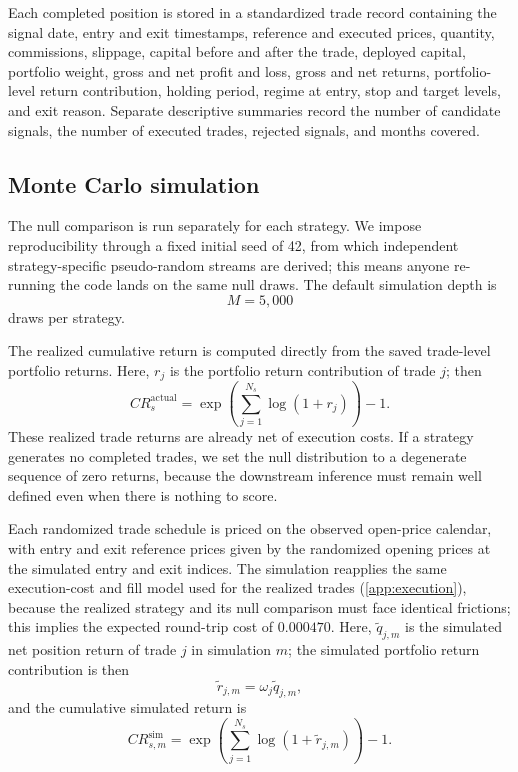 \documentclass[preprint,12pt]{elsarticle}
\theoremstyle{definition}
\begin{document}
Each completed position is stored in a standardized trade record containing the signal date, entry and exit timestamps, reference and executed prices, quantity, commissions, slippage, capital before and after the trade, deployed capital, portfolio weight, gross and net profit and loss, gross and net returns, portfolio-level return contribution, holding period, regime at entry, stop and target levels, and exit reason. Separate descriptive summaries record the number of candidate signals, the number of executed trades, rejected signals, and months covered.

\subsection{Monte Carlo simulation}

The null comparison is run separately for each strategy. We impose reproducibility through a fixed initial seed of 42, from which independent strategy-specific pseudo-random streams are derived; this means anyone re-running the code lands on the same null draws. The default simulation depth is
\begin{equation}
M=5{,}000
\end{equation}
draws per strategy.

The realized cumulative return is computed directly from the saved trade-level portfolio returns. Here, \(r_j\) is the portfolio return contribution of trade \(j\); then
\begin{equation}
CR_s^{\mathrm{actual}}
=
\exp\left(\sum_{j=1}^{N_s}\log(1+r_j)\right)-1.
\end{equation}
These realized trade returns are already net of execution costs. If a strategy generates no completed trades, we set the null distribution to a degenerate sequence of zero returns, because the downstream inference must remain well defined even when there is nothing to score.

Each randomized trade schedule is priced on the observed open-price calendar, with entry and exit reference prices given by the randomized opening prices at the simulated entry and exit indices. The simulation reapplies the same execution-cost and fill model used for the realized trades (\ref{app:execution}), because the realized strategy and its null comparison must face identical frictions; this implies the expected round-trip cost of $0.000470$. Here, \(\tilde{q}_{j,m}\) is the simulated net position return of trade \(j\) in simulation \(m\); the simulated portfolio return contribution is then
\begin{equation}
\tilde{r}_{j,m}=\omega_j \tilde{q}_{j,m},
\end{equation}
and the cumulative simulated return is
\begin{equation}
CR_{s,m}^{\mathrm{sim}}
=
\exp\left(\sum_{j=1}^{N_s}\log(1+\tilde{r}_{j,m})\right)-1.
\end{equation}
\end{document}
